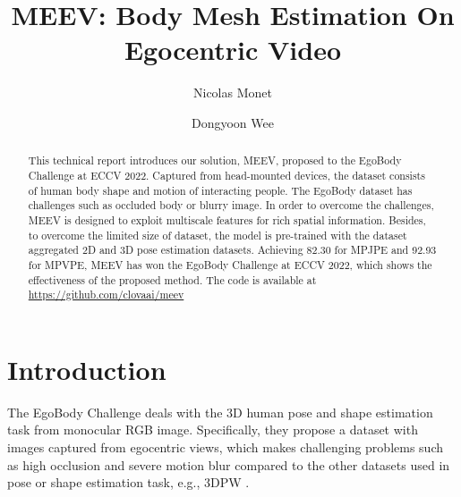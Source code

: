 \documentclass[runningheads]{llncs}
\begin{document}
\pagestyle{headings}
\mainmatter
\def\ECCVSubNumber{6}  

\title{MEEV: Body Mesh Estimation On Egocentric Video} 

\begin{comment}
\titlerunning{ECCV-22 submission ID \ECCVSubNumber} 
\authorrunning{ECCV-22 submission ID \ECCVSubNumber} 
\author{Anonymous ECCV submission}
\institute{Paper ID \ECCVSubNumber}
\end{comment}


\author{Nicolas Monet \and Dongyoon Wee}

\maketitle

\begin{abstract}
This technical report introduces our solution, MEEV, proposed to the EgoBody Challenge at ECCV 2022. Captured from head-mounted devices, the dataset consists of human body shape and motion of interacting people. 
The EgoBody dataset has challenges such as occluded body or blurry image. In order to overcome the challenges, MEEV is designed to exploit multiscale features for rich spatial information. Besides, to overcome the limited size of dataset, the model is pre-trained with the dataset aggregated 2D and 3D pose estimation datasets.
Achieving 82.30 for MPJPE and 92.93 for MPVPE, MEEV has won the EgoBody Challenge at ECCV 2022, which shows the effectiveness of the proposed method. 
The code is available at \url{https://github.com/clovaai/meev}

\end{abstract}


\section{Introduction}
The EgoBody Challenge\cite{Zhang:ECCV:2022} deals with the 3D human pose and shape estimation task from  monocular RGB image. Specifically, they propose a dataset with images captured from egocentric views, which makes challenging problems such as high occlusion and severe motion blur compared to the other datasets used in pose or shape estimation task, e.g., 3DPW \cite{vonMarcard2018}.
\end{document}
